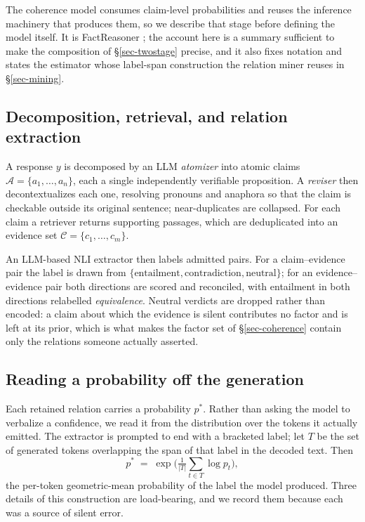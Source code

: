 The coherence model consumes claim-level probabilities and reuses the inference machinery that
produces them, so we describe that stage before defining the model itself. It is FactReasoner
\citep{factreasoner}; the account here is a summary sufficient to make the composition of
\S\ref{sec-twostage} precise, and it also fixes notation and states the estimator whose
label-span construction the relation miner reuses in \S\ref{sec-mining}.

\subsection{Decomposition, retrieval, and relation extraction}

A response $y$ is decomposed by an LLM \emph{atomizer} into atomic claims
$\mathcal{A}=\{a_1,\dots,a_n\}$, each a single independently verifiable proposition. A
\emph{reviser} then decontextualizes each one, resolving pronouns and anaphora so that the claim
is checkable outside its original sentence; near-duplicates are collapsed. For each claim a
retriever returns supporting passages, which are deduplicated into an evidence set
$\mathcal{C}=\{c_1,\dots,c_m\}$.

An LLM-based NLI extractor then labels admitted pairs. For a claim--evidence pair the label is
drawn from $\{\text{entailment},\text{contradiction},\text{neutral}\}$; for an evidence--evidence
pair both directions are scored and reconciled, with entailment in both directions relabelled
\emph{equivalence}. Neutral verdicts are dropped rather than encoded: a claim about which the
evidence is silent contributes no factor and is left at its prior, which is what makes the factor
set of \S\ref{sec-coherence} contain only the relations someone actually asserted.

\subsection{Reading a probability off the generation}
\label{sec-pstar}

Each retained relation carries a probability $p^\ast$. Rather than asking the model to verbalize a
confidence, we read it from the distribution over the tokens it actually emitted. The extractor is
prompted to end with a bracketed label; let $T$ be the set of generated tokens overlapping the
span of that label in the decoded text. Then
\begin{equation}
p^\ast \;=\; \exp\!\Big(\tfrac{1}{|T|}\textstyle\sum_{t\in T}\log p_t\Big),
\label{eq-pstar}
\end{equation}
the per-token geometric-mean probability of the label the model produced. Three details of this
construction are load-bearing, and we record them because each was a source of silent error.

